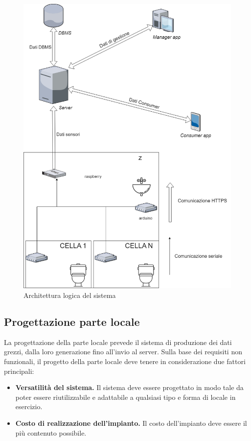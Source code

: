 \documentclass[12pt]{article}
\begin{document}
\begin{figure}[h!]
\centering
  \includegraphics[scale=0.33]{img/architettura_logica-report.png}
  \caption{Architettura logica del sistema}
\end{figure}
\subsection{Progettazione parte locale}
La progettazione della parte locale prevede il sistema di produzione dei dati grezzi, dalla loro generazione fino all'invio al server.
Sulla base dei requisiti non funzionali, il progetto della parte locale deve tenere in considerazione due fattori principali:
\begin{itemize}
	\item \textbf{Versatilità del sistema.}
	Il sistema deve essere progettato in modo tale da poter essere riutilizzabile e adattabile a qualsiasi tipo e forma di locale in esercizio. 
	\item \textbf{Costo di realizzazione dell'impianto.}
	Il costo dell'impianto deve essere il più contenuto possibile.
\end{itemize}  
\end{document}
